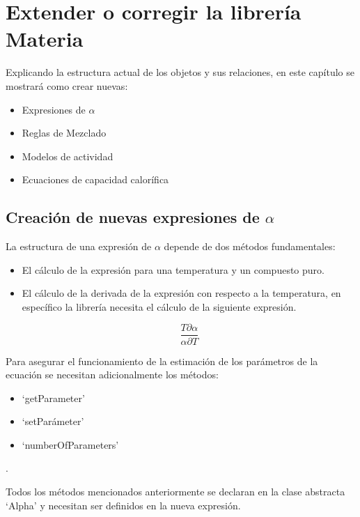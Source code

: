 \chapter{Extender o corregir la librería Materia}\label{chap:libraryExtension}
	
 	Explicando la estructura actual de los objetos y sus relaciones, en este capítulo se mostrará como crear nuevas:

 	\begin{itemize}\itemsep0ex
 		\item{Expresiones de $\alpha$}
 		\item{Reglas de Mezclado}
 		\item{Modelos de actividad} 		
 		\item{Ecuaciones de capacidad calorífica} 		
 	\end{itemize}

 
 	\section{Creación de nuevas expresiones de $\alpha$}\label{sec:newAlphaExpressions}

 	La estructura de una expresión de $\alpha$ depende de dos métodos fundamentales: 

 		\begin{itemize}\itemsep0ex
 			\item El cálculo de la expresión para una temperatura y un compuesto puro.
 			\item El cálculo de la derivada de la expresión con respecto a la temperatura, en específico la librería necesita el cálculo de la siguiente expresión.

 			\begin{equation}
 				\frac{T \partial \alpha}{\alpha \partial T}
 			\end{equation}
 		\end{itemize}

 	Para asegurar el funcionamiento de la estimación de los parámetros de la ecuación se necesitan adicionalmente los métodos:
 		\begin{itemize}\itemsep0ex
 			\item `getParameter'
 			\item `setParámeter'
 			\item `numberOfParameters'
 		\end{itemize}

	.

	Todos los métodos mencionados anteriormente se declaran en la clase abstracta `Alpha' y necesitan ser definidos en la nueva expresión. 

